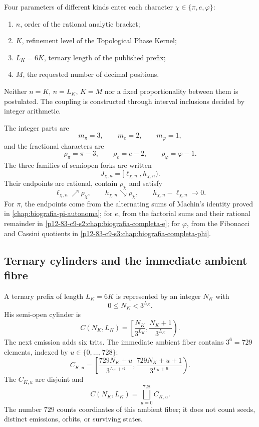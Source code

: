 Four parameters of different kinds enter each character \(\chi\in\{\pi,e,\varphi\}\):
\begin{enumerate}
 \item \(n\), order of the rational analytic bracket;
 \item \(K\), refinement level of the Topological Phase Kernel;
 \item \(L_K=6K\), ternary length of the published prefix;
 \item \(M\), the requested number of decimal positions.
\end{enumerate}
Neither \(n=K\), \(n=L_K\), \(K=M\) nor a fixed proportionality
between them is postulated. The coupling is constructed through interval inclusions
decided by integer arithmetic.

The integer parts are
\[
 m_\pi=3,
 \qquad
 m_e=2,
 \qquad
 m_\varphi=1,
\]
and the fractional characters are
\[
 \rho_\pi=\pi-3,
 \qquad
 \rho_e=e-2,
 \qquad
 \rho_\varphi=\varphi-1.
\]
The three families of semiopen forks are written
\[
 J_{\chi,n}=[\ell_{\chi,n},h_{\chi,n}).
\]
Their endpoints are rational, contain \(\rho_\chi\) and satisfy
\[
 \ell_{\chi,n}\nearrow\rho_\chi,
 \qquad
 h_{\chi,n}\searrow\rho_\chi,
 \qquad
 h_{\chi,n}-\ell_{\chi,n}\longrightarrow0.
\]
For \(\pi\), the endpoints come from the alternating sums of Machin’s
identity proved in \cref{chap:biografia-pi-autonoma}; for \(e\),
from the factorial sums and their rational remainder in
\cref{p12-83-c9-s2:chap:biografia-completa-e}; for \(\varphi\), from the Fibonacci
and Cassini quotients in \cref{p12-83-c9-s3:chap:biografia-completa-phi}.

\subsection{Ternary cylinders and the immediate ambient fibre}

A ternary prefix of length \(L_K=6K\) is represented by an integer
\(N_K\) with
\[
 0\leq N_K<3^{L_K}.
\]
His semi-open cylinder is
\begin{equation}
 C(N_K,L_K)=
 \left[
 \frac{N_K}{3^{L_K}},
 \frac{N_K+1}{3^{L_K}}
 \right).
 \label{p12-83-c9-s4:eq:cilindro-nivel-K}
\end{equation}
The next emission adds six trits. The immediate ambient fiber contains
\(3^6=729\) elements, indexed by \(u\in\{0,\ldots,728\}\):
\begin{equation}
 C_{K,u}=
 \left[
 \frac{729N_K+u}{3^{L_K+6}},
 \frac{729N_K+u+1}{3^{L_K+6}}
 \right).
 \label{p12-83-c9-s4:eq:729-subcilindros}
\end{equation}
The \(C_{K,u}\) are disjoint and
\[
 C(N_K,L_K)=\bigsqcup_{u=0}^{728}C_{K,u}.
\]
The number \(729\) counts coordinates of this ambient fiber; it does not count
seeds, distinct emissions, orbits, or surviving states.

